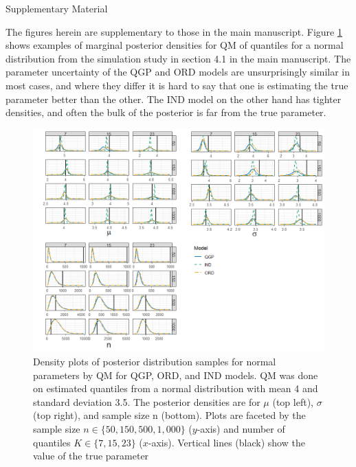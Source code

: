 \documentclass[preprint,12pt,authoryear]{elsarticle}
\begin{document}
% 



\Huge
\begin{center}
  Supplementary Material
\end{center}
\normalsize





The figures herein are supplementary to those in the main manuscript. Figure 
\ref{fig:norm_dens} shows examples of marginal
posterior densities for QM of quantiles for a normal distribution from the 
simulation study in section 4.1 in
the main manuscript. The parameter uncertainty of the QGP and ORD models are 
unsurprisingly similar in
most cases, and where they differ it is hard to say that one is estimating the 
true parameter better than the
other. The IND model on the other hand has tighter densities, and often the 
bulk of the posterior is far from
the true parameter.


\begin{figure}
\centering
  \includegraphics[width = 1.1\linewidth]{Images/norm_params_fit.png}
\caption{Density plots of posterior distribution samples for normal parameters 
by QM for QGP, ORD, and
IND models. QM was done on estimated quantiles from a normal distribution with 
mean 4 and standard
deviation 3.5. The posterior densities are for $\mu$ (top left), 
$\sigma$ (top right), and 
sample size n (bottom). Plots are
faceted by the sample size $n \in \{50, 150, 500, 1,000\}$ 
($y$-axis) and number of 
quantiles $K \in \{7, 15, 23\}$ ($x$-axis).
Vertical lines (black) show the value of the true parameter}
\label{fig:norm_dens}
\end{figure}
\end{document}
